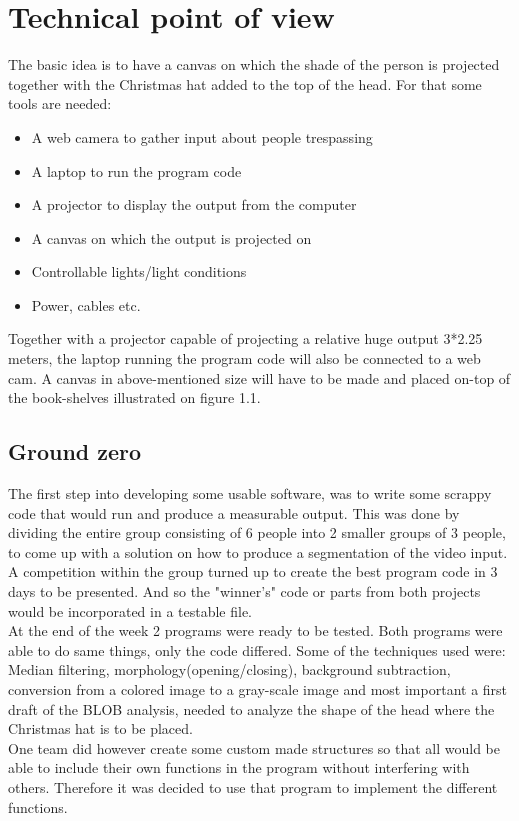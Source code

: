\section{Technical point of view}
The basic idea is to have a canvas on which the shade of the person is projected together with the Christmas hat added to the top of the head. For that some tools are needed:

\begin{itemize}
\item A web camera to gather input about people trespassing
\item A laptop to run the program code
\item A projector to display the output from the computer
\item A canvas on which the output is projected on
\item Controllable lights/light conditions
\item Power, cables etc.
\end{itemize}

Together with a projector capable of projecting a relative huge output 3*2.25 meters, the laptop running the program code will also be connected to a web cam. A canvas in above-mentioned size will have to be made and placed on-top of the book-shelves illustrated on figure 1.1.

\subsection{Ground zero}
The first step into developing some usable software, was to write some scrappy code that would run and produce a measurable output. This was done by dividing the entire group consisting of 6 people into 2 smaller groups of 3 people, to come up with a solution on how to produce a segmentation of the video input. A competition within the group turned up to create the best program code in 3 days to be presented. And so the "winner's" code or parts from both projects would be incorporated in a testable file.\\
At the end of the week 2 programs were ready to be tested. Both programs were able to do same things, only the code differed. Some of the techniques used were: Median filtering, morphology(opening/closing), background subtraction, conversion from a colored image to a gray-scale image and most important a first draft of the BLOB analysis, needed to analyze the shape of the head where the Christmas hat is to be placed.\\
One team did however create some custom made structures so that all would be able to include their own functions in the program without interfering with others. Therefore it was decided to use that program to implement the different functions.

